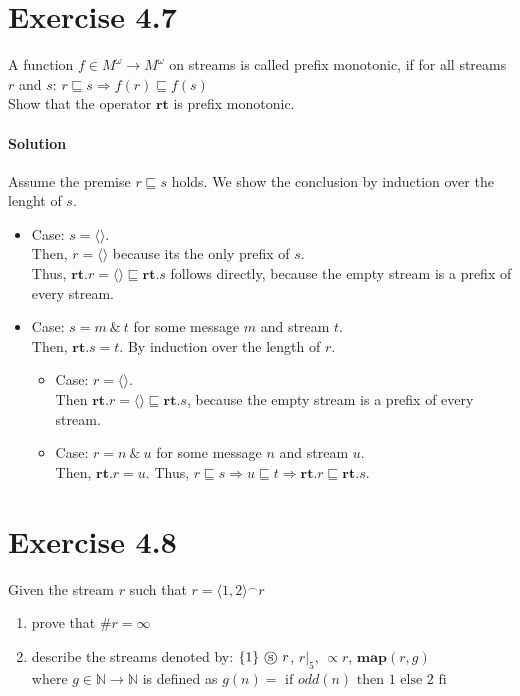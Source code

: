 \documentclass{article}[12pt]
\newcommand{\concat}{\ensuremath{^{\frown}}}
\newcommand{\stuterringremoval}{\ensuremath{\propto}}
\newcommand{\cons}{\ \&\ }
\newcommand{\stream}[1]{\langle#1\rangle}
\newcommand{\naturals}{\ensuremath{\mathbb{N}}}
\newcommand{\prefixordering}{\ensuremath{\sqsubseteq}}
\newcommand{\length}{\ensuremath{\#}}
\newcommand{\filter}{\ \ensuremath{\text{\textcircled{s}}}\ }
\newcommand{\rt}{\ensuremath{\textbf{rt}}}
\newcommand{\map}{\ensuremath{\textbf{map}}}
\begin{document}
   \section{Exercise 4.7}
   A function $f \in M^{\omega} \rightarrow M^{\omega}$ on streams is called prefix monotonic, if for all streams $r$ and $s$: $r \prefixordering s \Rightarrow f(r) \prefixordering f(s)$\\
   Show that the operator $\rt$ is prefix monotonic.
    \paragraph{Solution} Assume the premise $r \prefixordering s$ holds. We show the conclusion by induction over the lenght of $s$.
    \begin{itemize}
        \item {Case: $s = \stream{}$.\\
            Then, $r = \stream{}$ because its the only prefix of $s$.\\
            Thus, $\rt.r = \stream{} \prefixordering \rt.s$ follows directly, because the empty stream is a prefix of every stream.
        }
        \item { Case: $s = m \cons t$ for some message $m$ and stream $t$.\\
            Then, $\rt.s = t$. By induction over the length of $r$.
            \begin{itemize}
                \item { Case: $r = \stream{}$.\\
                    Then $\rt.r = \stream{} \prefixordering \rt.s$, because the empty stream is a prefix of every stream.
                }
                \item { Case: $r = n \cons u$ for some message $n$ and stream $u$.\\
                    Then, $\rt.r = u$.
                    Thus, $r \prefixordering s \Rightarrow u \prefixordering t \Rightarrow \rt.r \prefixordering \rt.s$.
                }
            \end{itemize}
        }
    \end{itemize}
   \section{Exercise 4.8}
   Given the stream $r$ such that $r = \stream{1,2} \concat r$
   \begin{enumerate}
        \item prove that $\length r = \infty$
        \item describe the streams denoted by: $\{1\} \filter r$, $r|_{5}$, $\stuterringremoval r$, $\map(r, g)$\\
        where $g \in \naturals \rightarrow \naturals$ is defined as $g(n) = \text{ if } odd(n) \text{ then } 1 \text{ else } 2 \text{ fi }$
   \end{enumerate}
\end{document}

